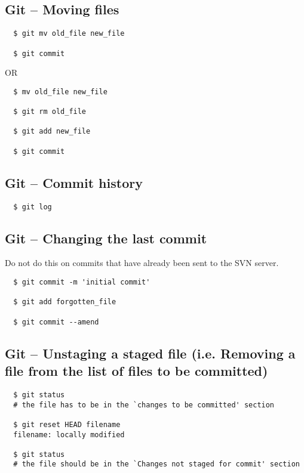 \documentclass[11pt,twoside]{article}
\begin{document}
\subsection*{Git -- Moving files}

\begin{verbatim}
  $ git mv old_file new_file

  $ git commit
\end{verbatim}

OR

\begin{verbatim}
  $ mv old_file new_file

  $ git rm old_file

  $ git add new_file

  $ git commit
\end{verbatim}

\subsection*{Git -- Commit history}

\begin{verbatim}
  $ git log
\end{verbatim}

\subsection*{Git -- Changing the last commit}

Do not do this on commits that have already been sent to the SVN server.

\begin{verbatim}
  $ git commit -m 'initial commit'

  $ git add forgotten_file

  $ git commit --amend
\end{verbatim}

\subsection*{Git -- Unstaging a staged file (i.e. Removing a file from the list of files to be
committed)}

\begin{verbatim}
  $ git status
  # the file has to be in the `changes to be committed' section

  $ git reset HEAD filename
  filename: locally modified

  $ git status
  # the file should be in the `Changes not staged for commit' section
\end{verbatim}
\end{document}
